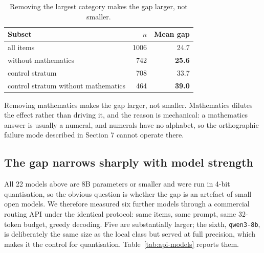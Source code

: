 \documentclass[final]{clv2025}
\begin{document}
\begin{table}[h!]
\caption{Removing the largest category makes the gap larger, not smaller.}
\label{tab:composition}
\centering
\begin{tabular}{lrr}
\toprule
Subset & $n$ & Mean gap \\
\midrule
all items & 1006 & 24.7 \\
without mathematics & 742 & \textbf{25.6} \\
control stratum & 708 & 33.7 \\
control stratum without mathematics & 464 & \textbf{39.0} \\
\bottomrule
\end{tabular}
\end{table}

Removing mathematics makes the gap larger, not smaller. Mathematics dilutes the
effect rather than driving it, and the reason is mechanical: a mathematics
answer is usually a numeral, and numerals have no alphabet, so the orthographic
failure mode described in Section 7 cannot operate there.

\subsection{The gap narrows sharply with model strength}

All 22 models above are 8B parameters or smaller and were run in 4-bit
quantisation, so the obvious question is whether the gap is an artefact of
small open models. We therefore measured six further models through a
commercial routing API under the identical protocol: same items, same prompt,
same 32-token budget, greedy decoding. Five are substantially larger; the
sixth, \texttt{qwen3-8b}, is deliberately the same size as the local class but
served at full precision, which makes it the control for quantisation.
Table~\ref{tab:api-models} reports them.
\end{document}
